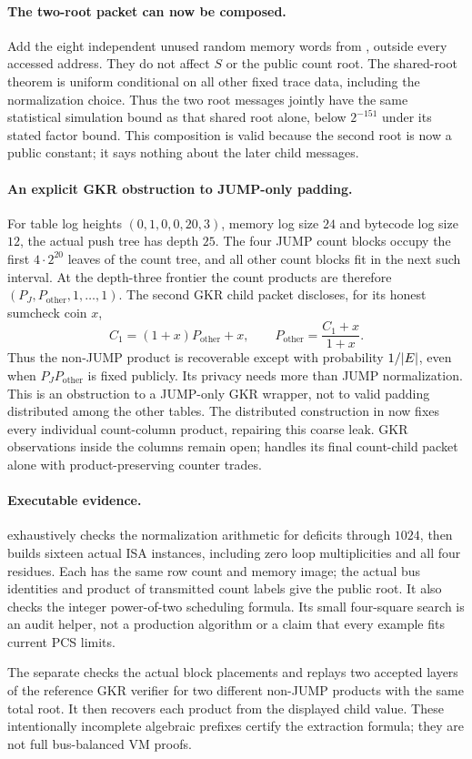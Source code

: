 \paragraph{The two-root packet can now be composed.} Add the eight independent unused random memory words from , outside every accessed address. They do not affect $S$ or the public count root. The shared-root theorem is uniform conditional on all other fixed trace data, including the normalization choice. Thus the two root messages jointly have the same statistical simulation bound as that shared root alone, below $2^{-151}$ under its stated factor bound. This composition is valid because the second root is now a public constant; it says nothing about the later child messages.

\paragraph{An explicit GKR obstruction to JUMP-only padding.} For table log heights $(0,1,0,0,20,3)$, memory log size $24$ and bytecode log size $12$, the actual push tree has depth $25$. The four JUMP count blocks occupy the first $4\cdot2^{20}$ leaves of the count tree, and all other count blocks fit in the next such interval. At the depth-three frontier the count products are therefore $(P_J,P_{\mathrm{other}},1,\ldots,1)$. The second GKR child packet discloses, for its honest sumcheck coin $x$,
\[
 C_1=(1+x)P_{\mathrm{other}}+x,
 \qquad P_{\mathrm{other}}=\frac{C_1+x}{1+x}.
\]
Thus the non-JUMP product is recoverable except with probability $1/|E|$, even when $P_JP_{\mathrm{other}}$ is fixed publicly. Its privacy needs more than JUMP normalization. This is an obstruction to a JUMP-only GKR wrapper, not to valid padding distributed among the other tables. The distributed construction in  now fixes every individual count-column product, repairing this coarse leak. GKR observations inside the columns remain open;  handles its final count-child packet alone with product-preserving counter trades.

\paragraph{Executable evidence.}  exhaustively checks the normalization arithmetic for deficits through $1024$, then builds sixteen actual ISA instances, including zero loop multiplicities and all four residues. Each has the same row count and memory image; the actual bus identities and product of transmitted count labels give the public root. It also checks the integer power-of-two scheduling formula. Its small four-square search is an audit helper, not a production algorithm or a claim that every example fits current PCS limits.

The separate  checks the actual block placements and replays two accepted layers of the reference GKR verifier for two different non-JUMP products with the same total root. It then recovers each product from the displayed child value. These intentionally incomplete algebraic prefixes certify the extraction formula; they are not full bus-balanced VM proofs.
